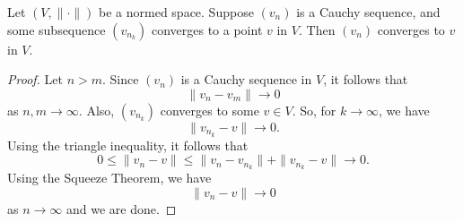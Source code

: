 \documentclass[a4paper]{article}
\begin{document}
\begin{lemma}\label{lemma}
   Let \( (V, \|\cdot\|) \) be a normed space. Suppose \( ({v}_{n}) \) is a Cauchy sequence, and some subsequence \( ({v}_{{n}_{k}}) \) converges to a point \( v  \) in \( V  \). Then \( ({v}_{n}) \) converges to \( v  \) in \( V  \).   
\end{lemma}
\begin{proof}
Let \( n > m  \). Since \( ({v}_{n}) \) is a Cauchy sequence in \( V  \), it follows that 
\[  \|{v}_{n} - {v}_{m} \| \to 0  \]
as \( n,m \to \infty  \). Also, \( ({v}_{{n}_{k}}) \) converges to some \( v \in V  \). So, for \( k \to \infty  \), we have 
\[  \|{v}_{{n}_{k}} - v \| \to 0. \]
Using the triangle inequality, it follows that 
\[  0 \leq \|{v}_{n} - v \| \leq \|{v}_{n} - {v}_{{n}_{k}} \| + \|{v}_{{n}_{k }} - v \| \to 0.  \]
Using the Squeeze Theorem, we have 
\[  \|{v}_{n} - v \| \to 0  \]
as \( n \to \infty  \) and we are done.
\end{proof}
\end{document}
